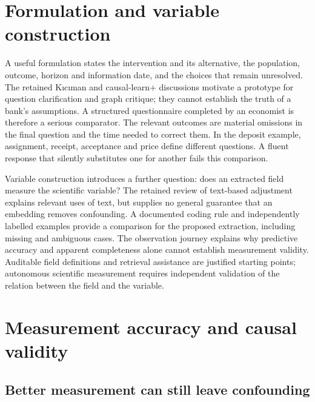 \section{Formulation and variable construction}
A useful formulation states the intervention and its alternative, the
population, outcome, horizon and information date, and the choices that remain
unresolved. The retained Kıcıman and causal-learn+ discussions motivate a
prototype for question clarification and graph critique; they cannot establish
the truth of a bank's assumptions. A structured questionnaire completed by an
economist is therefore a serious comparator. The relevant outcomes are material
omissions in the final question and the time needed to correct them. In the
deposit example, assignment, receipt, acceptance and price define different
questions. A fluent response that silently substitutes one for another fails
this comparison. \citep{v12_la_2305_00050,v12_la_2606_23608}

Variable construction introduces a further question: does an extracted field
measure the scientific variable? The retained review of text-based adjustment
explains relevant uses of text, but supplies no general guarantee that an
embedding removes confounding. A documented coding rule and independently
labelled examples provide a comparison for the proposed extraction, including
missing and ambiguous cases. The observation journey explains why predictive
accuracy and apparent completeness alone cannot establish measurement validity.
Auditable field definitions and retrieval assistance are justified starting
points; autonomous scientific measurement requires independent validation of
the relation between the field and the variable. \citep{exec13_census_text_review_arxiv}



\section{Measurement accuracy and causal validity}
\label{reading:assistance-conclusions}

\subsection{Better measurement can still leave confounding}

